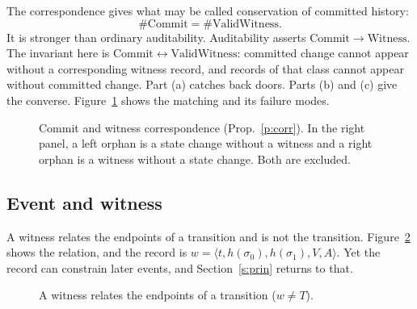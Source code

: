\documentclass[11pt]{article}
\newcommand{\hash}{h}
\begin{document}
The correspondence gives what may be called conservation of committed history:
\[
\#\mathrm{Commit}=\#\mathrm{ValidWitness}.
\]
It is stronger than ordinary auditability. Auditability asserts $\mathrm{Commit}\to\mathrm{Witness}$. The invariant here is $\mathrm{Commit}\leftrightarrow\mathrm{ValidWitness}$: committed change cannot appear without a corresponding witness record, and records of that class cannot appear without committed change. Part (a) catches back doors. Parts (b) and (c) give the converse. Figure~\ref{f:bip} shows the matching and its failure modes.

\begin{figure}[h]
\centering
{}
\caption{Commit and witness correspondence (Prop.~\ref{p:corr}). In the right panel, a left orphan is a state change without a witness and a right orphan is a witness without a state change. Both are excluded.}
\label{f:bip}
\end{figure}

\subsection{Event and witness}

A witness relates the endpoints of a transition and is not the transition. Figure~\ref{f:chord} shows the relation, and the record is $w=\langle t,\hash(\sigma_0),\hash(\sigma_1),V,A\rangle$. Yet the record can constrain later events, and Section~\ref{s:prin} returns to that.

\begin{figure}[h]
\centering
{}
\caption{A witness relates the endpoints of a transition ($w\neq T$).}
\label{f:chord}
\end{figure}
\end{document}
